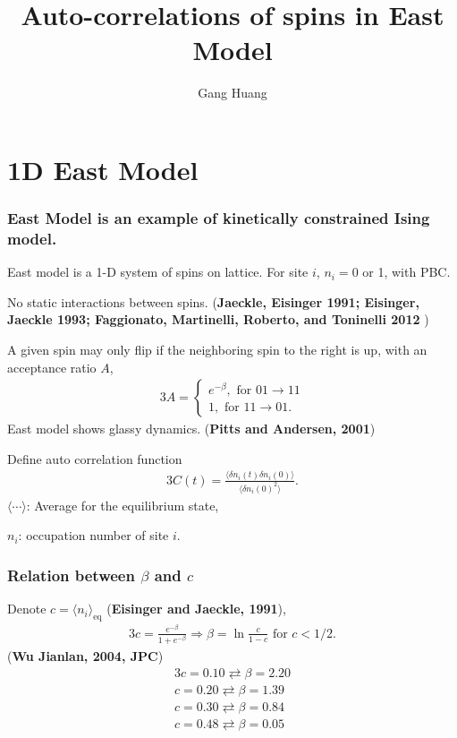 \documentclass[8pt]{beamer}
\title{Auto-correlations of spins in East Model}
\author{Gang Huang}
\begin{document}
\maketitle

\section{1D East Model}
\begin{frame}
	\frametitle{East Model is an example of kinetically constrained Ising model.} 
	East model is a 1-D system of spins on lattice. For site $i$, $n_i =0$ or 1, with PBC. 
	
	No static interactions between spins. (\textbf{Jaeckle, Eisinger 1991; Eisinger, Jaeckle 1993; Faggionato, Martinelli, Roberto, and Toninelli 2012 })
	
	A given spin may only flip if the neighboring spin to the right is up, with an acceptance ratio $A$,
     \begin{alignat}{3}
       A = \left\{
       \begin{aligned}
	     e^{-\beta}, \text{ for } 01 \to 11 \\
         1, \text{ for } 11 \to 01.
       \end{aligned}
       \right
       .
     \end{alignat}
 East model shows glassy dynamics. (\textbf{Pitts and Andersen, 2001})
 
 Define auto correlation function
      \begin{alignat}{3}
      C(t) = \frac{\langle\delta n_i(t)\delta n_i (0)\rangle}{\langle \delta n_i(0)^2 \rangle}.
 \end{alignat}
$\langle \cdots \rangle$: Average for the equilibrium state,

$n_i$: occupation number of site $i$.
\end{frame}

\begin{frame}
	\frametitle{Relation between $\beta$ and $c$}
	Denote $c = \langle n_i \rangle_{\text{eq}}$ (\textbf{Eisinger and Jaeckle, 1991}),
	\begin{alignat}{3}
		c= \frac{e^{-\beta}}{1+ e^{-\beta}} \Rightarrow \beta = \ln \frac{c}{1-c} \text{ for } c < 1/2.
	\end{alignat}
	(\textbf{Wu Jianlan, 2004, JPC})	
	\begin{alignat}{3}
		c = 0.10 \rightleftarrows \beta = 2.20 \nonumber\\
		c = 0.20 \rightleftarrows \beta = 1.39 \nonumber\\
		c = 0.30 \rightleftarrows \beta = 0.84 \nonumber\\
		c = 0.48 \rightleftarrows \beta =  0.05 
	\end{alignat}
\end{frame}
\end{document}
